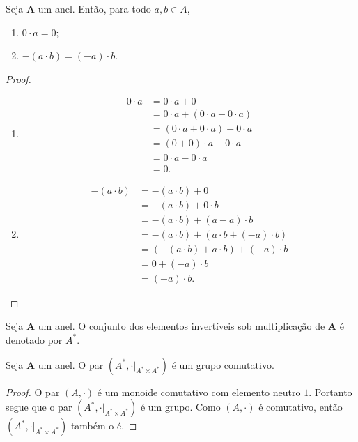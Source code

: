 \begin{prop}
	Seja $\bm A$ um anel. Então, para todo $a,b \in A$,
	\begin{enumerate}
	\item $0 \cdot a = 0$;
	\item $-(a \cdot b) = (-a) \cdot b$.
	\end{enumerate}
\end{prop}
\begin{proof}
	\begin{enumerate}
	\item
		\begin{align*}
		0 \cdot a &= 0 \cdot a + 0 \\
			&= 0 \cdot a + (0 \cdot a - 0 \cdot a) \\
			&= (0 \cdot a + 0 \cdot a) - 0 \cdot a \\
			&= (0+0) \cdot a - 0 \cdot a \\
			&= 0 \cdot a - 0 \cdot a \\
			&= 0.
		\end{align*}
	\item
		\begin{align*}
		-(a \cdot b) &= -(a \cdot b) + 0 \\
			&= -(a \cdot b) + 0 \cdot b \\
			&= -(a \cdot b) + (a - a) \cdot b \\
			&= -(a \cdot b) + (a \cdot b + (-a) \cdot b) \\
			&= (-(a \cdot b) + a \cdot b) + (-a) \cdot b \\
			&= 0 + (-a) \cdot b \\
			&= (-a) \cdot b.
		\end{align*}
	\end{enumerate}
\end{proof}

\begin{defi}
	Seja $\bm A$ um anel. O conjunto dos elementos invertíveis sob multiplicação de $\bm A$ é denotado por $A^*$.
\end{defi}

\begin{prop}
	Seja $\bm A$ um anel. O par $(A^*,\cdot|_{A^* \times A^*})$ é um grupo comutativo.
\end{prop}
\begin{proof}
	O par $(A,\cdot)$ é um monoide comutativo com elemento neutro $1$. Portanto segue que o par $(A^*,\cdot|_{A^* \times A^*})$ é um grupo. Como $(A,\cdot)$ é comutativo, então $(A^*,\cdot|_{A^* \times A^*})$ também o é.
\end{proof}

